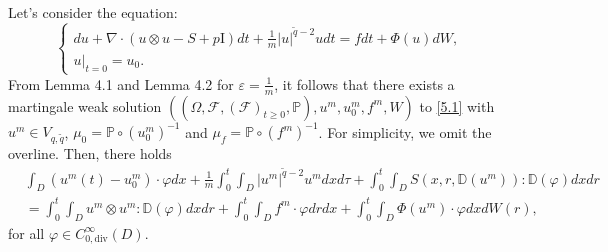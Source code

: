 \documentclass[reqno]{amsart}
\theoremstyle{definition}
\theoremstyle{remark}
\numberwithin{equation}{section} \allowdisplaybreaks
\begin{document}
Let's consider the equation:
\begin{equation}\label{5.1}
\begin{cases}
du+\nabla\cdot(u\otimes u-S+p\text{I})dt+\frac{1}{m}|u|^{\tilde{q}-2}udt=fdt+\Phi(u)dW,\\
u|_{t=0}=u_0.
\end{cases}
\end{equation}
From Lemma 4.1 and Lemma 4.2 for $\varepsilon=\frac{1}{m}$, it
follows that there exists a martingale weak solution
$((\Omega,\mathscr{F},(\mathscr{F})_{t\geq0},\mathbb{P}),u^m,u^m_0,f^m,W)$
to \eqref{5.1} with $u^m\in V_{q,\tilde{q}}$, $\mu_0=\mathbb{P}\circ
(u^m_0)^{-1}$ and $\mu_f=\mathbb{P}\circ (f^m)^{-1}$. For
simplicity, we omit the overline. Then, there holds
\begin{equation*}
\begin{split}
&\int_{D}(u^m(t)-u^m_0)\cdot\varphi dx+\frac{1}{m}\int_0^t\!\!\!\int_{D}|u^m|^{\tilde{q}-2}u^mdxd\tau+\int_0^t\!\!\!\int_{D}S(x,r,\mathbb{D}(u^m)):\mathbb{D}(\varphi) dxdr\\
&=\int_0^t\!\!\!\int_{D}u^m\otimes u^m :\mathbb{D}(\varphi)
dxdr+\int_0^t\!\!\!\int_{D}f^m\cdot \varphi dr
dx+\int_0^t\!\!\!\int_{D}\Phi(u^m)\cdot \varphi dx dW(r),
\end{split}
\end{equation*}
for all $\varphi\in C_{0,\text{div}}^{\infty}(D)$.
\end{document}
